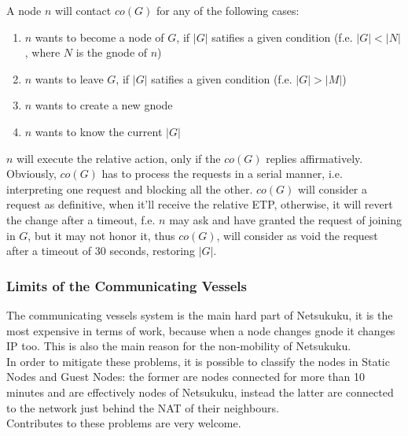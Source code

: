 \documentclass[a4paper]{article}
\begin{document}
A node $n$ will contact $co(G)$ for any of the following cases:
\begin{enumerate}
	\item $n$ wants to become a node of $G$,
		if $|G|$ satifies a given condition (f.e. $|G| < |N|$, where $N$ is the gnode of $n$)
	\item $n$ wants to leave $G$,
		if $|G|$ satifies a given condition (f.e. $|G| > |M|$)
	\item $n$ wants to create a new gnode
	\item $n$ wants to know the current $|G|$
\end{enumerate}
$n$ will execute the relative action, only if the $co(G)$ replies
affirmatively. Obviously, $co(G)$ has to process the requests in a serial
manner, i.e. interpreting one request and blocking all the other. $co(G)$ will
consider a request as definitive, when it'll receive the relative ETP,
otherwise, it will revert the change after a timeout, f.e. $n$ may ask and
have granted the request of joining in $G$, but it may not honor it, thus
$co(G)$, will consider as void the request after a timeout of 30 seconds,
restoring $|G|$.\\

\subsubsection{Limits of the Communicating Vessels}
The communicating vessels system is the main hard part of Netsukuku, it is the
most expensive in terms of work, because when a node changes gnode it changes
IP too. This is also the main reason for the non-mobility of Netsukuku.\\
In order to mitigate these problems, it is possible to classify the nodes in
Static Nodes and Guest Nodes: the former are nodes connected for more than 10
minutes and are effectively nodes of Netsukuku, instead the latter are
connected to the network just behind the NAT of their neighbours.\\

Contributes to these problems are very welcome.
\end{document}
